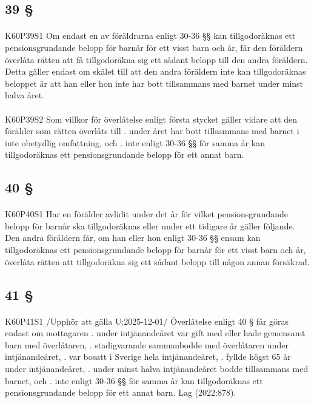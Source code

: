 \documentclass[a4paper,notitlepage,openany,10pt]{book}
\begin{document}
\subsection*{39 §}
\paragraph*{}
{\tiny K60P39S1}
Om endast en av föräldrarna enligt 30-36 §§ kan tillgodoräknas ett pensionsgrundande belopp för barnår för ett visst barn och år, får den föräldern överlåta rätten att få tillgodoräkna sig ett sådant belopp till den andra föräldern. Detta gäller endast om skälet till att den andra föräldern inte kan tillgodoräknas beloppet är att han eller hon inte har bott tillsammans med barnet under minst halva året.
\paragraph*{}
{\tiny K60P39S2}
Som villkor för överlåtelse enligt första stycket gäller vidare att den förälder som rätten överlåts till
. under året har bott tillsammans med barnet i inte obetydlig omfattning, och
. inte enligt 30-36 §§ för samma år kan tillgodoräknas ett pensionsgrundande belopp för ett annat barn.
\subsection*{40 §}
\paragraph*{}
{\tiny K60P40S1}
Har en förälder avlidit under det år för vilket pensionsgrundande belopp för barnår ska tillgodoräknas eller under ett tidigare år gäller följande. Den andra föräldern får, om han eller hon enligt 30-36 §§ ensam kan tillgodoräknas ett pensionsgrundande belopp för barnår för ett visst barn och år, överlåta rätten att tillgodoräkna sig ett sådant belopp till någon annan försäkrad.
\subsection*{41 §}
\paragraph*{}
{\tiny K60P41S1}
/Upphör att gälla U:2025-12-01/
Överlåtelse enligt 40 § får göras endast om mottagaren
. under intjänandeåret var gift med eller hade gemensamt barn med överlåtaren,
. stadigvarande sammanbodde med överlåtaren under intjänandeåret,
. var bosatt i Sverige hela intjänandeåret,
. fyllde högst 65 år under intjänandeåret,
. under minst halva intjänandeåret bodde tillsammans med barnet, och
. inte enligt 30-36 §§ för samma år kan tillgodoräknas ett pensionsgrundande belopp för ett annat barn.
Lag (2022:878).
\end{document}

